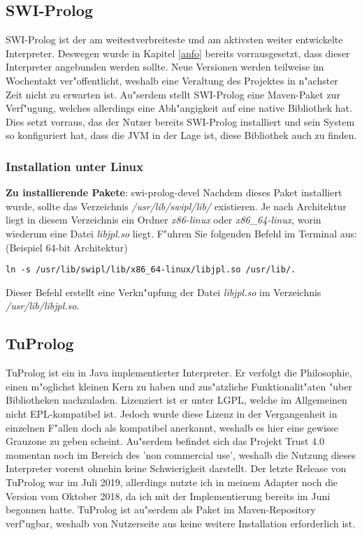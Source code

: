 \subsection{SWI-Prolog}
SWI-Prolog\cite{swi} ist der am weitestverbreiteste und am aktivsten weiter entwickelte Interpreter. Deswegen wurde in Kapitel \ref{anfo} bereits vorrausgesetzt, dass dieser Interpreter angebunden werden sollte. Neue Versionen werden teilweise im Wochentakt ver"offentlicht, weshalb eine Veraltung des Projektes in n"achster Zeit nicht zu erwarten ist. Au"serdem stellt SWI-Prolog eine Maven-Paket zur Verf"ugung, welches allerdings eine Abh"angigkeit auf eine native Bibliothek hat. Dies setzt vorraus, das der Nutzer bereits SWI-Prolog installiert und sein System so konfiguriert hat, dass die JVM in der Lage ist, diese Bibliothek auch zu finden.
\subsubsection{Installation unter Linux}
\textbf{Zu installierende Pakete}: swi-prolog-devel\newline
\newline
Nachdem dieses Paket installiert wurde, sollte das Verzeichnis \emph{/usr/lib/swipl/lib/} existieren. Je nach Architektur liegt in diesem Verzeichnis ein Ordner \emph{x86-linux} oder \emph{x86\_64-linux}, worin wiederum eine Datei \emph{libjpl.so} liegt. F"uhren Sie folgenden Befehl im Terminal aus: (Beispiel 64-bit Architektur)\newline
\begin{verbatim}
ln -s /usr/lib/swipl/lib/x86_64-linux/libjpl.so /usr/lib/.
\end{verbatim}
Dieser Befehl erstellt eine Verkn"upfung der Datei \emph{libjpl.so} im Verzeichnis \emph{/usr/lib/libjpl.so}.

\subsection{TuProlog}
TuProlog\cite{tuprolog} ist ein in Java implementierter Interpreter. Er verfolgt die Philosophie, einen m"oglichst kleinen Kern zu haben und zus"atzliche Funktionalit"aten "uber Bibliotheken nachzuladen. Lizenziert ist er unter LGPL, welche im Allgemeinen nicht EPL-kompatibel ist\cite{eplkompatibel}. Jedoch wurde diese Lizenz in der Vergangenheit in einzelnen F"allen doch als kompatibel anerkannt, weshalb es hier eine gewisse Grauzone zu geben scheint. Au"serdem befindet sich das Projekt Trust 4.0 momentan noch im Bereich des 'non commercial use', weshalb die Nutzung dieses Interpreter vorerst ohnehin keine Schwierigkeit darstellt. Der letzte Release von TuProlog war im Juli 2019, allerdings nutzte ich in meinem Adapter noch die Version vom Oktober 2018, da ich mit der Implementierung bereits im Juni begonnen hatte. TuProlog ist au"serdem als Paket im Maven-Repository verf"ugbar, weshalb von Nutzerseite aus keine weitere Installation erforderlich ist.

